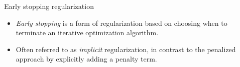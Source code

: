 \documentclass[aspectratio=169,xcolor=dvipsnames]{beamer}
\begin{document}
\begin{frame}{Early stopping regularization}
	
%	
	
	\begin{itemize}
		\item \textit{Early stopping} is a form of regularization based on choosing when to terminate an iterative optimization algorithm. 
		
		\vspace{5pt}
		
		\item Often referred to as \textit{implicit} regularization, in contrast to the penalized approach by explicitly adding a penalty term. 
	\end{itemize}
	
\end{frame}
\end{document}
